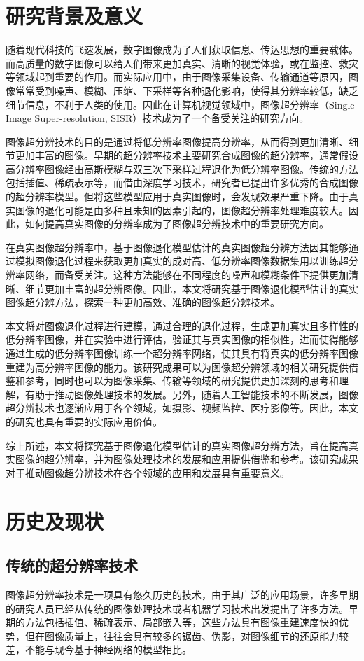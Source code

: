 \section{研究背景及意义}
随着现代科技的飞速发展，数字图像成为了人们获取信息、传达思想的重要载体。而高质量的数字图像可以给人们带来更加真实、清晰的视觉体验，或在监控、救灾等领域起到重要的作用。而实际应用中，由于图像采集设备、传输通道等原因，图像常常受到噪声、模糊、压缩、下采样等各种退化影响，使得其分辨率较低，缺乏细节信息，不利于人类的使用。因此在计算机视觉领域中，图像超分辨率（Single Image Super-resolution, SISR）技术成为了一个备受关注的研究方向。

图像超分辨技术的目的是通过将低分辨率图像提高分辨率，从而得到更加清晰、细节更加丰富的图像。早期的超分辨率技术主要研究合成图像的超分辨率，通常假设高分辨率图像经由高斯模糊与双三次下采样过程退化为低分辨率图像。传统的方法包括插值、稀疏表示等，而借由深度学习技术，研究者已提出许多优秀的合成图像的超分辨率模型。但将这些模型应用于真实图像时，会发现效果严重下降。由于真实图像的退化可能是由多种且未知的因素引起的，图像超分辨率处理难度较大。因此，如何提高真实图像的分辨率成为了图像超分辨技术中的重要研究方向。

在真实图像超分辨率中，基于图像退化模型估计的真实图像超分辨方法因其能够通过模拟图像退化过程来获取更加真实的成对高、低分辨率图像数据集用以训练超分辨率网络，而备受关注。这种方法能够在不同程度的噪声和模糊条件下提供更加清晰、细节更加丰富的超分辨图像。因此，本文将研究基于图像退化模型估计的真实图像超分辨方法，探索一种更加高效、准确的图像超分辨技术。

本文将对图像退化过程进行建模，通过合理的退化过程，生成更加真实且多样性的低分辨率图像，并在实验中进行评估，验证其与真实图像的相似性，进而使得能够通过生成的低分辨率图像训练一个超分辨率网络，使其具有将真实的低分辨率图像重建为高分辨率图像的能力。该研究成果可以为图像超分辨领域的相关研究提供借鉴和参考，同时也可以为图像采集、传输等领域的研究提供更加深刻的思考和理解，有助于推动图像处理技术的发展。另外，随着人工智能技术的不断发展，图像超分辨技术也逐渐应用于各个领域，如摄影、视频监控、医疗影像等。因此，本文的研究也具有重要的实际应用价值。

综上所述，本文将探究基于图像退化模型估计的真实图像超分辨方法，旨在提高真实图像的超分辨率，并为图像处理技术的发展和应用提供借鉴和参考。该研究成果对于推动图像超分辨技术在各个领域的应用和发展具有重要意义。
\section{历史及现状}
\subsection{传统的超分辨率技术}
图像超分辨率技术是一项具有悠久历史的技术，由于其广泛的应用场景，许多早期的研究人员已经从传统的图像处理技术或者机器学习技术出发提出了许多方法。早期的方法包括插值、稀疏表示、局部嵌入等，这些方法具有图像重建速度快的优势，但在图像质量上，往往会具有较多的锯齿、伪影，对图像细节的还原能力较差，不能与现今基于神经网络的模型相比。

